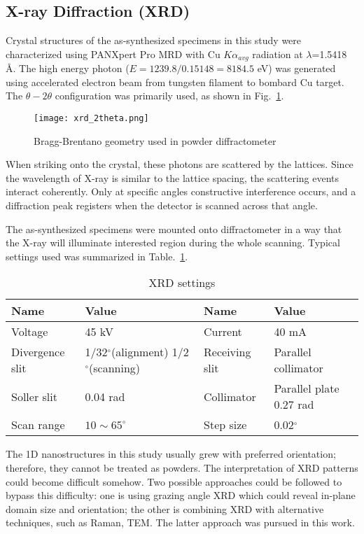 \subsection{X-ray Diffraction (XRD)}
Crystal structures of the as-synthesized specimens in this study were characterized using PANXpert Pro MRD with Cu $K\alpha_{avg}$ radiation at $\lambda$=1.5418 \si{\angstrom}. The high energy photon ($E = 1239.8/0.15148= 8184.5$ eV) was generated using accelerated electron beam from tungsten filament to bombard Cu target. The $\theta-2\theta$ configuration was primarily used, as shown in Fig.~\ref{fig:ch2theta}. 
\begin{figure}[htb]
\centering
\texttt{[image: xrd\_2theta.png]}
\caption[XRD configuration]{Bragg-Brentano geometry used in powder diffractometer}
\label{fig:ch2theta}
\end{figure}
When striking onto the crystal, these photons are scattered by the lattices. Since the wavelength of X-ray is similar to the lattice spacing, the scattering events interact coherently. Only at specific angles constructive interference occurs, and a diffraction peak registers when the detector is scanned across that angle.  

The as-synthesized specimens were mounted onto diffractometer in a way that the X-ray will illuminate interested region during the whole scanning. Typical settings used was summarized in Table.~\ref{tab:ch2xrd}.

\begin{table}[htb]
\centering
\caption{XRD settings}\label{tab:ch2xrd}
\begin{tabular}{lp{1.5in}lp{1.5in}}
\toprule
Name & Value & Name & Value  \\
\midrule
Voltage   & 45 kV & Current & 40 mA \\
Divergence slit & 1/32$^\circ$(alignment) 1/2$^\circ$(scanning) & Receiving slit& Parallel collimator \\
Soller slit & 0.04 rad & Collimator & Parallel plate 0.27 rad \\
Scan range & $10 \sim 65 ^\circ$ & Step size & 0.02$^\circ$ \\
\bottomrule
\end{tabular}
\end{table}

The 1D nanostructures in this study usually grew with preferred orientation; therefore, they cannot be treated as powders. The interpretation of XRD patterns could become difficult somehow. Two possible approaches could be followed to bypass this difficulty: one is using grazing angle XRD which could reveal in-plane domain size and orientation;\cite{Tersigni2011,Goorsky2002} the other is combining XRD with alternative techniques, such as Raman, TEM. The latter approach was pursued in this work. 


